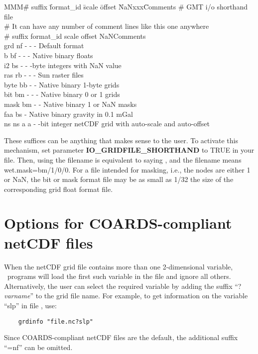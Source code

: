 \noindent
\begin{tabbing}
MMM\=\# suffix \=format\_id \=scale \=offset \=NaNxxx\=Comments \kill
\>\# GMT i/o shorthand file \\
\>\# It can have any number of comment lines like this one anywhere \\
\>\# suffix \> format\_id	\> scale \> offset \>NaN\>Comments \\
\>grd \> nf \> - \> - \> - \>Default format \\
\>b \> bf \> - \> - \> - \> Native binary floats \\
\>i2 \> bs \> - \> -  -byte integers with NaN value \\
\>ras \> rb \> - \> - \> - \> Sun raster files \\
\>byte \> bb \> - \> -  \> Native binary 1-byte grids \\
\>bit \> bm \> - \> - \> - \> Native binary 0 or 1 grids \\
\>mask \> bm \> - \> -  \> Native binary 1 or NaN masks \\
\>faa \> bs  \> -  \> Native binary gravity in 0.1 mGal \\
\>ns \> ns \> a \> a \> - -bit integer netCDF grid with auto-scale and auto-offset
\end{tabbing}

These suffices can be anything that makes sense to the user.  To
activate this mechanism, set parameter \textbf{IO\_GRIDFILE\_SHORTHAND} to TRUE in
your  file.  Then, using the filename
 is equivalent to saying ,
and the filename  means wet.mask=bm/1/0/0.  For a
file intended for masking, i.e., the nodes are either 1 or NaN,
the bit or mask format file may be as small as 1/32 the size of the
corresponding grid float format file.

\section{Options for COARDS-compliant netCDF files}
\label{sec:netcdf}

When the netCDF grid file contains more than one 2-dimensional variable, \GMT\ programs
will load the first such variable in the file and ignore all others. Alternatively,
the user can select the
required variable by adding the suffix ``?\emph{varname}'' to the grid file name. For example,
to get information on the variable ``slp'' in file , use:
\begin{verbatim}
	grdinfo "file.nc?slp"
\end{verbatim}
Since COARDS-compliant netCDF files are the default, the additional suffix ``=nf'' can be omitted.

